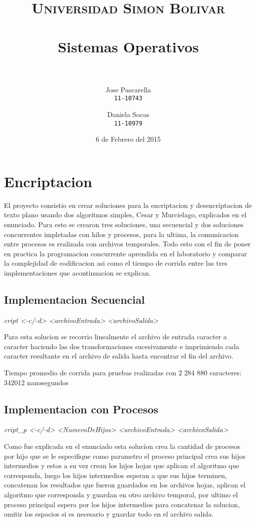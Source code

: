 \documentclass[paper=a4, fontsize=11pt]{scrartcl} %
\title{	
\normalfont \normalsize 
\textsc{Universidad Simon Bolivar} \\ [25pt] %
\horrule{0.5pt} \\[0.4cm] %
\huge Sistemas Operativos \\ %
\horrule{2pt} \\[0.5cm] %
}
\author{
  Jose Pascarella\\
  \texttt{11-10743}
  \and
  Daniela Socas\\
  \texttt{11-10979}
}
\date{6 de Febrero del 2015} %
\begin{document}
\maketitle %


\section{Encriptacion}

El proyecto consistio en crear soluciones para la encriptacion y desencriptacion de texto plano usando dos algoritmos simples, Cesar y Murcielago, explicados en el enunciado. Para esto se crearon tres soluciones, una secuencial y dos soluciones concurrentes impletadas con hilos y procesos, para la ultima, la comunicacion entre procesos es realizada con archivos temporales. Todo esto con el fin de poner en practica la programacion concurrente aprendida en el laboratorio y comparar la complejidad de codificacion asi como el tiempo de corrida entre las tres implementaciones que acontinuacion se explican.


\subsection{Implementacion Secuencial}\newline


\emph{cript <-c/-d> <archivoEntrada> <archivoSalida>}\newline

Para esta solucion se recorrio linealmente el archivo de entrada caracter a caracter haciendo las dos transformaciones sucesivamente e imprimiendo cada caracter resultante en el archivo de salida hasta encontrar el fin del archivo.

Tiempo promedio de corrida para pruebas realizadas con 2 284 880 caracteres: 342012 nanosegundos

\newpage


\subsection{Implementacion con Procesos}\newline

\emph{cript\_p <-c/-d> <NumeroDeHijos> <archivoEntrada> <archivoSalida>}\newline

Como fue explicada en el enunciado esta solucion crea la cantidad de procesos por hijo que se le especifique como parametro el proceso principal crea sus hijos intermedios y estos a su vez crean los hijos hojas que aplican el algoritmo que corresponda, luego los hijos intermedios esperan a que sus hijos terminen, concatenan los resultados que fueron guardados en los archivos hojas, aplican el algoritmo que corresponda y guardan en otro archivo temporal, por ultimo el proceso principal espera por los hijos intermedios para concatenar la solucion, omitir los espacios si es necesario y guardar todo en el archivo salida.
\end{document}
